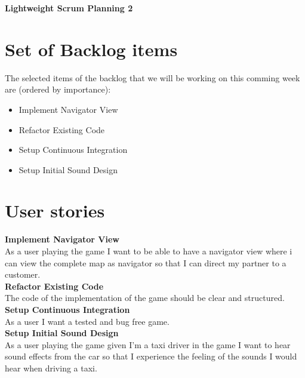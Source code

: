 \documentclass{article}
\begin{document}
\begin{minipage}[H]{\textwidth}
\vspace{0.3cm}
		\begin{center}
		\vspace{0.3cm}
			\Huge{\textbf{Lightweight Scrum Planning 2}}\\
		\vspace{0.3cm}	
		\vspace{0.7cm}		
		\end{center}
	\end{minipage}

\section*{Set of Backlog items}
The selected items of the backlog that we will be working on this comming week  are (ordered by importance):
\begin{itemize}
	\item Implement Navigator View
	\item Refactor Existing Code
	\item Setup Continuous Integration
	\item Setup Initial Sound Design
\end{itemize}

\section*{User stories}
\textbf{Implement Navigator View} \\
As a user playing the game I want to be able to have a navigator view where i can view the complete map as navigator so that I can direct my partner to a customer. \\
\newline
\textbf{Refactor Existing Code} \\
The code of the implementation of the game should be clear and structured. \\
\newline
\textbf{Setup Continuous Integration} \\
As a user I want a tested and bug free game. \\
\newline
\textbf{Setup Initial Sound Design} \\
As a user playing the game given I'm a taxi driver in the game I want to hear sound effects from the car so that I experience the feeling of the sounds I would hear when driving a taxi.
\end{document}
